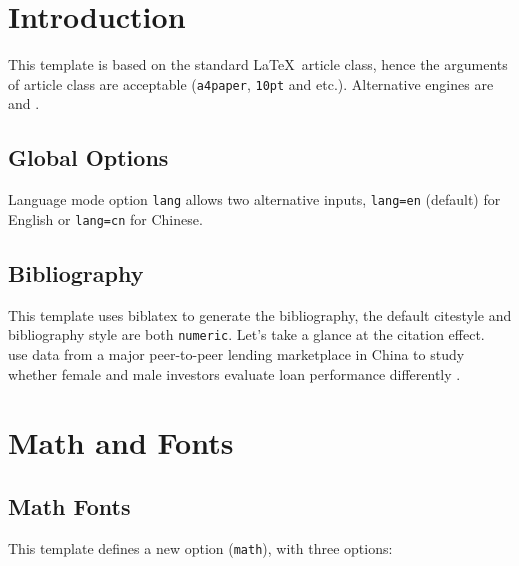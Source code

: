 \begin{abstract}
This documentation illustrates the usage of the \href{https://github.com/ElegantLaTeX/ElegantPaper}{ElegantPaper} template. This template is based on the standard \LaTeX\ article class, which is designed for working paper writing. With this template, you can get rid of all the worries about the format and merely focus on writing.
\par
{}
\end{abstract}

\section{Introduction}

This template is based on the standard \LaTeX\ article class, hence the arguments of article class are acceptable (\lstinline{a4paper}, \lstinline{10pt} and etc.). Alternative engines are  and .

\subsection{Global Options}
Language mode option \lstinline{lang} allows two alternative inputs, \lstinline{lang=en} (default) for English or \lstinline{lang=cn} for Chinese.

\subsection{Bibliography}

This template uses biblatex to generate the bibliography, the default citestyle and bibliography style are both \lstinline{numeric}. Let's take a glance at the citation effect. ~\cite{en1} use data from a major peer-to-peer lending \cite{en3} marketplace in China to study whether female and male investors evaluate loan performance differently \parencite{en2}.

\section{Math and Fonts}

\subsection{Math Fonts}

This template defines a new option (\lstinline{math}), with three options:

